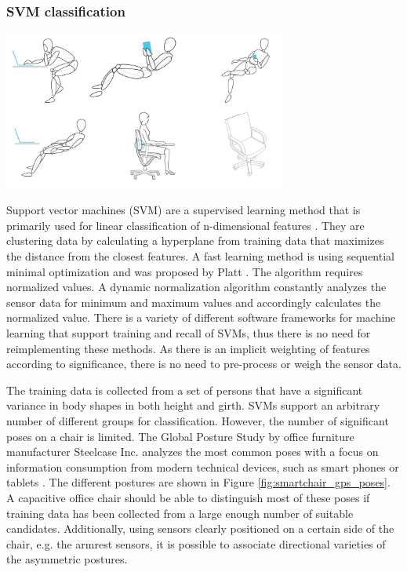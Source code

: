 \subsubsection*{SVM classification}
\begin{minipage}{\linewidth}
\centering
\includegraphics[width=0.7\textwidth]{images/smartchair_gps_poses}
\label{fig:smartchair_gps_poses}
\end{minipage}

Support vector machines (SVM) are a supervised learning method that is primarily used for linear classification of n-dimensional features \cite{hearst1998support}. They are clustering data by calculating a hyperplane from training data that maximizes the distance from the closest features. A fast learning method is using sequential minimal optimization and was proposed by Platt \cite{platt1999fast}. The algorithm requires normalized values. A dynamic normalization algorithm constantly analyzes the sensor data for minimum and maximum values and accordingly calculates the normalized value. There is a variety of different software frameworks for machine learning that support training and recall of SVMs, thus there is no need for reimplementing these methods. As there is an implicit weighting of features according to significance, there is no need to pre-process or weigh the sensor data.

The training data is collected from a set of persons that have a significant variance in body shapes in both height and girth. SVMs support an arbitrary number of different groups for classification. However, the number of significant poses on a chair is limited. The Global Posture Study by office furniture manufacturer Steelcase Inc. analyzes the most common poses with a focus on information consumption from modern technical devices, such as smart phones or tablets \cite{globalPosture}. The different postures are shown in Figure \ref{fig:smartchair_gps_poses}. A capacitive office chair should be able to distinguish most of these poses if training data has been collected from a large enough number of suitable candidates. Additionally, using sensors clearly positioned on a certain side of the chair, e.g. the armrest sensors, it is possible to associate directional varieties of the asymmetric postures.